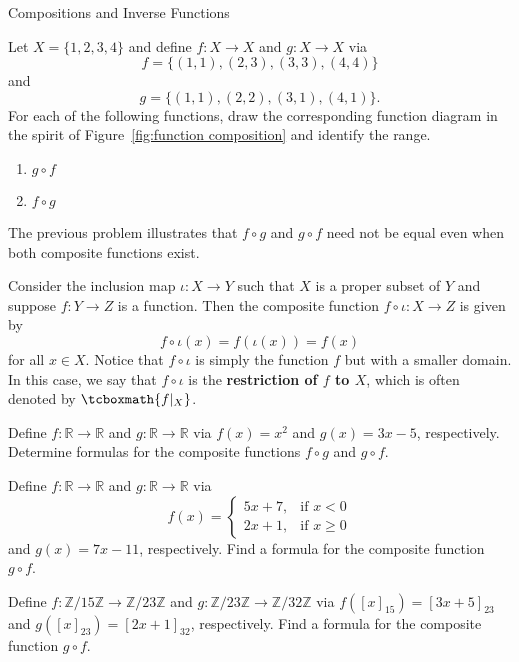 \begin{section}{Compositions and Inverse Functions}
\begin{problem}
Let $X=\{1,2,3,4\}$ and define $f:X\to X$ and $g:X\to X$ via
\[
f=\{(1,1),(2,3),(3,3),(4,4)\}
\]
and
\[
g=\{(1,1),(2,2),(3,1),(4,1)\}.
\]
For each of the following functions, draw the corresponding function diagram in the spirit of Figure~\ref{fig:function composition} and identify the range.
\begin{enumerate}[label=\textrm{(\alph*)}]
\item $g\circ f$
\item $f\circ g$
\end{enumerate}
\end{problem}

The previous problem illustrates that $f\circ g$ and $g\circ f$ need not be equal even when both composite functions exist.

\begin{example}
Consider the inclusion map $\iota:X\to Y$ such that $X$ is a proper subset of $Y$ and suppose $f:Y\to Z$ is a function. Then the composite function $f\circ \iota:X\to Z$ is given by
\[
f\circ \iota(x)=f(\iota(x))=f(x)
\]
for all $x\in X$. Notice that $f\circ \iota$ is simply the function $f$ but with a smaller domain.  In this case, we say that $f\circ \iota$ is the \textbf{restriction of $f$ to $X$}, which is often denoted by $\tcboxmath{f|_X}$.
\end{example}

\begin{problem}
Define $f:\mathbb{R}\to \mathbb{R}$ and $g:\mathbb{R}\to \mathbb{R}$ via $f(x)=x^2$ and $g(x)=3x-5$, respectively. Determine formulas for the composite functions $f\circ g$ and $g\circ f$.
\end{problem}

\begin{problem}
Define $f:\mathbb{R}\to \mathbb{R}$ and $g:\mathbb{R}\to \mathbb{R}$ via
\[
f(x)=\begin{cases}
5x+7, & \text{if }x< 0\\
2x+1, & \text{if }x\geq 0
\end{cases}
\]
and $g(x)=7x-11$, respectively. Find a formula for the composite function $g\circ f$.
\end{problem}

\begin{problem}
Define $f:\mathbb{Z}/15\mathbb{Z}\to \mathbb{Z}/23\mathbb{Z}$ and $g:\mathbb{Z}/23\mathbb{Z}\to \mathbb{Z}/32\mathbb{Z}$ via $f([x]_{15})=[3x+5]_{23}$ and $g([x]_{23})=[2x+1]_{32}$, respectively. Find a formula for the composite function $g\circ f$.
\end{problem}


\end{section}
